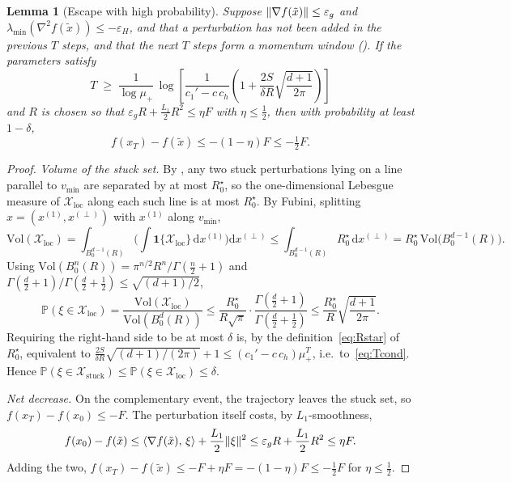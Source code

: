 \documentclass[11pt]{article}
\theoremstyle{plain}
\newtheorem{lemma}{Lemma}[section]
\theoremstyle{definition}
\theoremstyle{remark}
\DeclarePairedDelimiter{\norm}{\lVert}{\rVert}
\newcommand{\Prob}{\mathbb{P}}
\newcommand{\Vol}{\mathrm{Vol}}
\renewcommand{\d}{\mathrm{d}}
\newcommand{\lmin}{\lambda_{\min}}
\newcommand{\grad}{\nabla}
\newcommand{\Hess}{\nabla^2}
\newcommand{\inner}[2]{\langle #1,\, #2\rangle}
\newcommand{\eps}{\varepsilon}
\newcommand{\epsg}{\eps_{g}}
\newcommand{\epsH}{\eps_{H}}
\newcommand{\mup}{\mu_{+}}
\newcommand{\xt}{\tilde{x}}
\newcommand{\Rstar}{R_{0}^{\star}}
\begin{document}
\begin{lemma}[Escape with high probability]
\label{lem:escape}
Suppose $\norm{\grad f(\xt)}\le\epsg$ and
$\lmin(\Hess f(\xt))\le-\epsH$, and that a perturbation has not been
added in the previous $T$ steps, and that the next $T$ steps form a
momentum window (). If the parameters satisfy
\begin{equation}\label{eq:Tcond}
  T\;\ge\;\frac{1}{\log\mup}\,
  \log\!\left[\frac{1}{c_{1}'-c\,c_{h}}
  \left(1+\frac{2S}{\delta R}\sqrt{\frac{d+1}{2\pi}}\right)\right]
\end{equation}
and $R$ is chosen so that $\epsg R+\tfrac{L_{1}}{2}R^{2}\le\eta F$ with
$\eta\le\tfrac12$, then with probability at least $1-\delta$,
\begin{equation}\label{eq:netdecrease}
  f(x_{T})-f(\xt)\le-(1-\eta)F\le-\tfrac12F.
\end{equation}
\end{lemma}

\begin{proof}
\emph{Volume of the stuck set.} By , any two stuck
perturbations lying on a line parallel to $v_{\min}$ are separated by at
most $\Rstar$, so the one-dimensional Lebesgue measure of
$\mathcal{X}_{\mathrm{loc}}$ along each such line is at most $\Rstar$. By
Fubini, splitting $x=(x^{(1)},x^{(\perp)})$ with $x^{(1)}$ along
$v_{\min}$,
\[
  \Vol(\mathcal{X}_{\mathrm{loc}})
  =\int_{B^{d-1}_{0}(R)}\!\!\Big(\int 
  \mathbf{1}\{\mathcal{X}_{\mathrm{loc}}\}\,\d x^{(1)}\Big)\d x^{(\perp)}
  \le\int_{B^{d-1}_{0}(R)}\!\!\Rstar\,\d x^{(\perp)}
  =\Rstar\,\Vol\!\big(B^{d-1}_{0}(R)\big).
\]
Using $\Vol(B^{n}_{0}(R))=\pi^{n/2}R^{n}/\Gamma(\tfrac n2+1)$ and
$\Gamma(\tfrac d2+1)/\Gamma(\tfrac d2+\tfrac12)\le\sqrt{(d+1)/2}$,
\[
  \Prob(\xi\in\mathcal{X}_{\mathrm{loc}})
  =\frac{\Vol(\mathcal{X}_{\mathrm{loc}})}{\Vol(B^{d}_{0}(R))}
  \le\frac{\Rstar}{R\sqrt\pi}\cdot\frac{\Gamma(\tfrac d2+1)}{\Gamma(\tfrac d2+\tfrac12)}
  \le\frac{\Rstar}{R}\sqrt{\frac{d+1}{2\pi}}.
\]
Requiring the right-hand side to be at most $\delta$ is, by the
definition~\eqref{eq:Rstar} of $\Rstar$, equivalent to
$\tfrac{2S}{\delta R}\sqrt{(d+1)/(2\pi)}+1\le(c_{1}'-c\,c_{h})\mup^{T}$,
i.e.\ to~\eqref{eq:Tcond}. Hence
$\Prob(\xi\in\mathcal{X}_{\mathrm{stuck}})
\le\Prob(\xi\in\mathcal{X}_{\mathrm{loc}})\le\delta$.

\emph{Net decrease.} On the complementary event, the trajectory leaves
the stuck set, so $f(x_{T})-f(x_{0})\le-F$. The perturbation itself
costs, by $L_{1}$-smoothness,
\[
  f(x_{0})-f(\xt)\le\inner{\grad f(\xt)}{\xi}+\frac{L_{1}}{2}\norm{\xi}^{2}
  \le\epsg R+\frac{L_{1}}{2}R^{2}\le\eta F.
\]
Adding the two, $f(x_{T})-f(\xt)\le-F+\eta F=-(1-\eta)F\le-\tfrac12F$
for $\eta\le\tfrac12$.
\end{proof}
\end{document}
